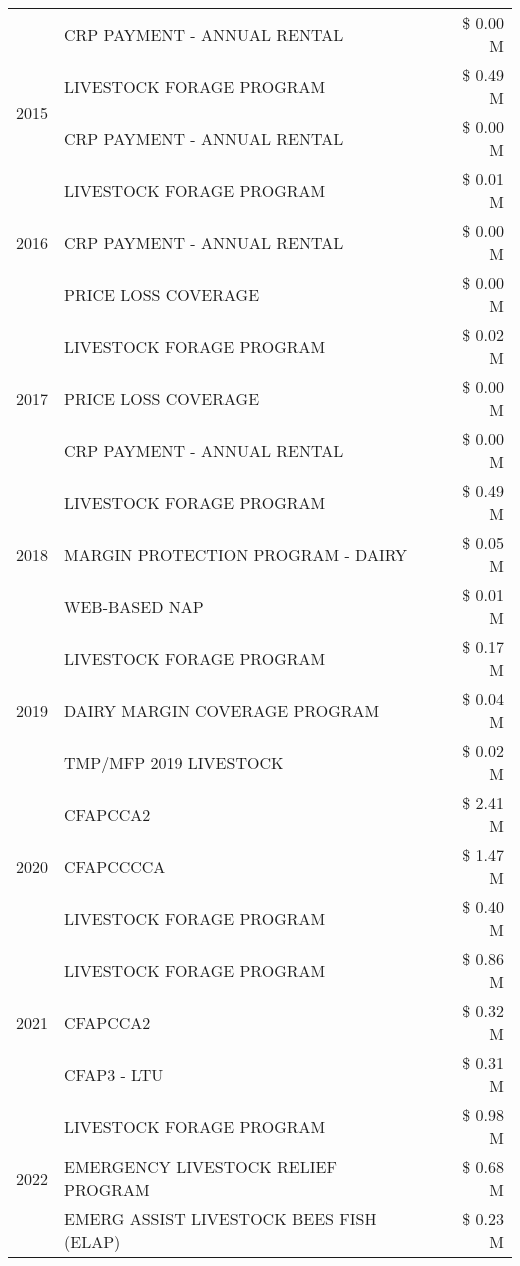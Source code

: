 \begin{tabular}{llr}
 & CRP PAYMENT - ANNUAL RENTAL & \$ 0.00 M \\
\cline{1-3}
\multirow[t]{2}{*}{2015} & LIVESTOCK FORAGE PROGRAM & \$ 0.49 M \\
 & CRP PAYMENT - ANNUAL RENTAL & \$ 0.00 M \\
\cline{1-3}
\multirow[t]{3}{*}{2016} & LIVESTOCK FORAGE PROGRAM & \$ 0.01 M \\
 & CRP PAYMENT - ANNUAL RENTAL & \$ 0.00 M \\
 & PRICE LOSS COVERAGE & \$ 0.00 M \\
\cline{1-3}
\multirow[t]{3}{*}{2017} & LIVESTOCK FORAGE PROGRAM & \$ 0.02 M \\
 & PRICE LOSS COVERAGE & \$ 0.00 M \\
 & CRP PAYMENT - ANNUAL RENTAL & \$ 0.00 M \\
\cline{1-3}
\multirow[t]{3}{*}{2018} & LIVESTOCK FORAGE PROGRAM & \$ 0.49 M \\
 & MARGIN PROTECTION PROGRAM - DAIRY & \$ 0.05 M \\
 & WEB-BASED NAP & \$ 0.01 M \\
\cline{1-3}
\multirow[t]{3}{*}{2019} & LIVESTOCK FORAGE PROGRAM & \$ 0.17 M \\
 & DAIRY MARGIN COVERAGE PROGRAM & \$ 0.04 M \\
 & TMP/MFP 2019 LIVESTOCK & \$ 0.02 M \\
\cline{1-3}
\multirow[t]{3}{*}{2020} & CFAPCCA2 & \$ 2.41 M \\
 & CFAPCCCCA & \$ 1.47 M \\
 & LIVESTOCK FORAGE PROGRAM & \$ 0.40 M \\
\cline{1-3}
\multirow[t]{3}{*}{2021} & LIVESTOCK FORAGE PROGRAM & \$ 0.86 M \\
 & CFAPCCA2 & \$ 0.32 M \\
 & CFAP3 - LTU & \$ 0.31 M \\
\cline{1-3}
\multirow[t]{3}{*}{2022} & LIVESTOCK FORAGE PROGRAM & \$ 0.98 M \\
 & EMERGENCY LIVESTOCK RELIEF PROGRAM & \$ 0.68 M \\
 & EMERG ASSIST LIVESTOCK BEES FISH (ELAP) & \$ 0.23 M \\
\cline{1-3}
\bottomrule
\end{tabular}
